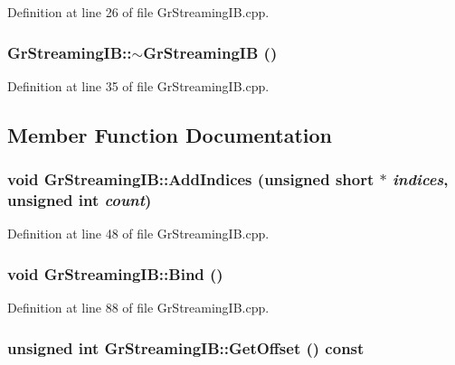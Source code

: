 Definition at line 26 of file GrStreamingIB.cpp.\hypertarget{class_gr_streaming_i_b_cca352c18f9ddb0e4f0be0ebbbb23519}{
\subsubsection[{$\sim$GrStreamingIB}]{\setlength{\rightskip}{0pt plus 5cm}GrStreamingIB::$\sim$GrStreamingIB ()}}
\label{class_gr_streaming_i_b_cca352c18f9ddb0e4f0be0ebbbb23519}




Definition at line 35 of file GrStreamingIB.cpp.

\subsection{Member Function Documentation}
\hypertarget{class_gr_streaming_i_b_af3e53f7c40298169bcaf4b342cbecaf}{
\subsubsection[{AddIndices}]{\setlength{\rightskip}{0pt plus 5cm}void GrStreamingIB::AddIndices (unsigned short $\ast$ {\em indices}, \/  unsigned int {\em count})}}
\label{class_gr_streaming_i_b_af3e53f7c40298169bcaf4b342cbecaf}




Definition at line 48 of file GrStreamingIB.cpp.\hypertarget{class_gr_streaming_i_b_a01b21e6d8ca9f23938fe4c6a02ba11e}{
\subsubsection[{Bind}]{\setlength{\rightskip}{0pt plus 5cm}void GrStreamingIB::Bind ()}}
\label{class_gr_streaming_i_b_a01b21e6d8ca9f23938fe4c6a02ba11e}




Definition at line 88 of file GrStreamingIB.cpp.\hypertarget{class_gr_streaming_i_b_6ebe51c20516af70e2beb954a402d7c2}{
\subsubsection[{GetOffset}]{\setlength{\rightskip}{0pt plus 5cm}unsigned int GrStreamingIB::GetOffset () const}}
\label{class_gr_streaming_i_b_6ebe51c20516af70e2beb954a402d7c2}




